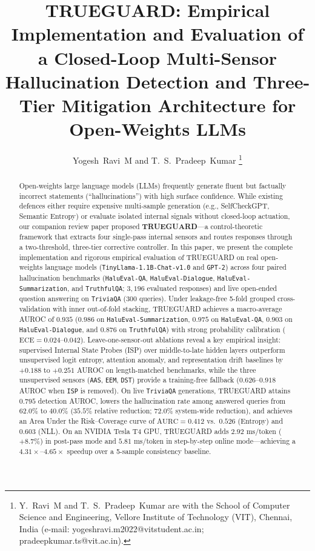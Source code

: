 \documentclass[journal]{IEEEtran}
\begin{document}
\title{TRUEGUARD: Empirical Implementation and Evaluation of a Closed-Loop Multi-Sensor Hallucination Detection and Three-Tier Mitigation Architecture for Open-Weights LLMs}

\author{Yogesh~Ravi~M and T.~S.~Pradeep~Kumar%
\thanks{Y.~Ravi~M and T.~S.~Pradeep~Kumar are with the School of Computer Science and Engineering, Vellore Institute of Technology (VIT), Chennai, India (e-mail: yogeshravi.m2022@vitstudent.ac.in; pradeepkumar.ts@vit.ac.in).}}

\maketitle

\begin{abstract}
Open-weights large language models (LLMs) frequently generate fluent but factually incorrect statements (``hallucinations'') with high surface confidence. While existing defences either require expensive multi-sample generation (e.g., SelfCheckGPT, Semantic Entropy) or evaluate isolated internal signals without closed-loop actuation, our companion review paper proposed \textbf{TRUEGUARD}---a control-theoretic framework that extracts four single-pass internal sensors and routes responses through a two-threshold, three-tier corrective controller. In this paper, we present the complete implementation and rigorous empirical evaluation of TRUEGUARD on real open-weights language models (\texttt{TinyLlama-1.1B-Chat-v1.0} and \texttt{GPT-2}) across four paired hallucination benchmarks (\texttt{HaluEval-QA}, \texttt{HaluEval-Dialogue}, \texttt{HaluEval-Summarization}, and \texttt{TruthfulQA}; $3{,}196$ evaluated responses) and live open-ended question answering on \texttt{TriviaQA} ($300$ queries). Under leakage-free 5-fold grouped cross-validation with inner out-of-fold stacking, TRUEGUARD achieves a macro-average AUROC of $0.935$ ($0.986$ on \texttt{HaluEval-Summarization}, $0.975$ on \texttt{HaluEval-QA}, $0.903$ on \texttt{HaluEval-Dialogue}, and $0.876$ on \texttt{TruthfulQA}) with strong probability calibration ($\text{ECE} = 0.024\text{--}0.042$). Leave-one-sensor-out ablations reveal a key empirical insight: supervised Internal State Probes (ISP) over middle-to-late hidden layers outperform unsupervised logit entropy, attention anomaly, and representation drift baselines by $+0.188$ to $+0.251$ AUROC on length-matched benchmarks, while the three unsupervised sensors (\texttt{AAS}, \texttt{EEM}, \texttt{DST}) provide a training-free fallback ($0.626\text{--}0.918$ AUROC when \texttt{ISP} is removed). On live \texttt{TriviaQA} generations, TRUEGUARD attains $0.795$ detection AUROC, lowers the hallucination rate among answered queries from $62.0\%$ to $40.0\%$ ($35.5\%$ relative reduction; $72.0\%$ system-wide reduction), and achieves an Area Under the Risk--Coverage curve of $\text{AURC} = 0.412$ vs.\ $0.526$ (Entropy) and $0.603$ (NLL). On an NVIDIA Tesla T4 GPU, TRUEGUARD adds $2.92\text{ ms/token}$ ($+8.7\%$) in post-pass mode and $5.81\text{ ms/token}$ in step-by-step online mode---achieving a $4.31\times\text{--}4.65\times$ speedup over a 5-sample consistency baseline.
\end{abstract}
\end{document}
